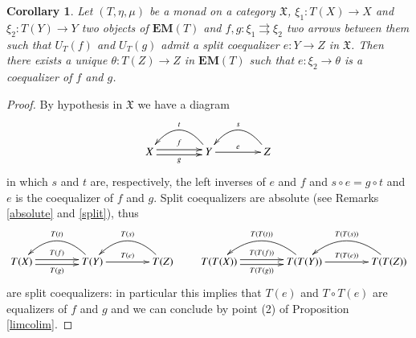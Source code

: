 \documentclass[12pt]{article}
\newtheorem{corollary}[lemma]{Corollary}
\theoremstyle{definition}
\def\X{\mathfrak X}
\newcommand{\eim}[1]{\mathbf{EM}{(#1)}}
\numberwithin{equation}{section}
\begin{document}
\begin{corollary}\label{split_coeq}
	Let $(T, \eta, \mu)$ be a monad on a category $\X$, $\xi_1:T(X)\rightarrow X$ and $\xi_2:T(Y)\rightarrow Y$ two objects of $\eim{T}$ and $f,g:\xi_1 \rightrightarrows \xi_2$ two arrows between them such that $U_T(f)$ and $U_T(g)$ admit a split coequalizer $e:Y\rightarrow Z$ in $\X$. Then there exists a unique $\theta:T(Z)\rightarrow Z$ in $\eim{T}$ such that $e:\xi_2\rightarrow \theta$ is a coequalizer of $f$ and $g$. 
\end{corollary}
\begin{proof}By hypothesis in $\X$ we have a diagram 	
	\[
	\xymatrix@C=40pt{
		X\ar@<-.5ex>[r]_{g}\ar@<.5ex>[r]^{f}&Y\ar[r]^{e} \ar@/_.7cm/[l]_{t}&Z\ar@/_0.7cm/[l]_{s} 
	}
	\]
	in which $s$ and $t$ are, respectively, the left inverses of $e$ and $f$ and $s\circ e=g\circ t$ and $e$ is the coequalizer of $f$ and $g$. Split coequalizers are absolute (see Remarks \ref{absolute} and \ref{split}), thus 
	\[
	\xymatrix@C=40pt{
		T(X)\ar@<-.5ex>[r]_{T(g)}\ar@<.5ex>[r]^{T(f)}&T(Y)\ar[r]^{T(e)} \ar@/_.7cm/[l]_{T(t)}&T(Z)\ar@/_0.7cm/[l]_{T(s)} 
	} \qquad 	\xymatrix@C=40pt{
	T(T(X))\ar@<-.5ex>[r]_{T(T(g))}\ar@<.5ex>[r]^{T(T(f))}&T(T(Y))\ar[r]^{T(T(e))} \ar@/_.7cm/[l]_{T(T(t))}&T(T(Z))\ar@/_0.7cm/[l]_{T(T(s))} 
}
	\]
	are split coequalizers: in particular this implies that $T(e)$ and $T\circ T(e)$ are equalizers of $f$ and $g$ and we can conclude by point (2) of Proposition \ref{limcolim}.
\end{proof}
\end{document}
